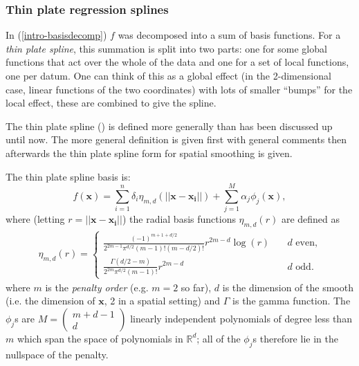 \subsubsection{Thin plate regression splines}
\label{GAMtprs}
\label{GAMtprspenalty}

In (\ref{intro-basisdecomp}) $f$ was decomposed into a sum of basis functions. For a \textit{thin plate spline}, this summation is split into two parts: one for some global functions that act over the whole of the data and one for a set of local functions, one per datum. One can think of this as a global effect (in the 2-dimensional case, linear functions of the two coordinates) with lots of smaller ``bumps'' for the local effect, these are combined to give the spline.

The thin plate spline (\cite{duchon77}) is defined more generally than has been discussed up until now. The more general definition is given first with general comments then afterwards the thin plate spline form for spatial smoothing is given. 

The thin plate spline basis is:
\begin{equation}
f(\mathbf{x}) = \sum_{i=1}^n \delta_i \eta_{m,d}(\lvert \lvert \mathbf{x}-\mathbf{x_i}\rvert \rvert) + \sum_{j=1}^M \alpha_j \phi_j(\mathbf{x}),
\label{tprs-basis} 
\end{equation}
where (letting $r=\lvert \lvert \mathbf{x}-\mathbf{x_i}\rvert \rvert$) the radial basis functions $\eta_{m,d}(r)$ are defined as
\begin{align*}
\eta_{m,d}(r) =\begin{cases} \frac{(-1)^{m+1+d/2}}{2^{2m-1}\pi^{d/2}(m-1)!(m-d/2)!} r^{2m-d} \log(r) &\quad{\text{$d$ even,}}\\
\frac{\Gamma(d/2-m)}{2^{2m}\pi^{d/2}(m-1)!} r^{2m-d} &\quad{\text{$d$ odd.}}
\end{cases}
\end{align*}
where $m$ is the \textit{penalty order} (e.g. $m=2$ so far), $d$ is the dimension of the smooth (i.e. the dimension of $\mathbf{x}$, 2 in a spatial setting) and $\Gamma$ is the gamma function. The $\phi_j$s are $M=\left( \begin{smallmatrix} m+d-1 \\ d  \end{smallmatrix}\right)$ linearly independent polynomials of degree less than $m$ which span the space of polynomials in $\mathbb{R}^d$; all of the $\phi_j$s therefore lie in the nullspace of the penalty.


